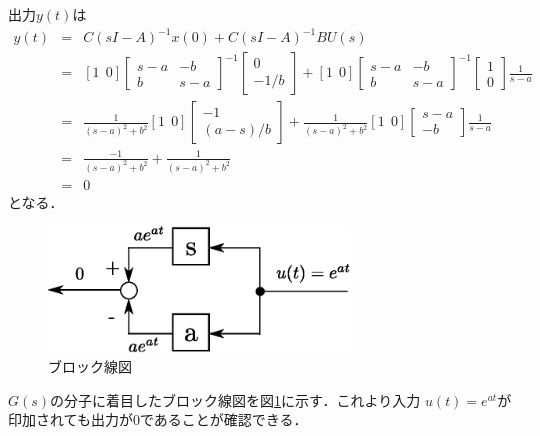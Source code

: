 \documentclass[a4paper,12pt]{jarticle}
\begin{document}
\vspace{-10mm}
\section*{}
出力$y(t)$は
\begin{eqnarray}
 y(t)&=&C(sI-A)^{-1}x(0)+C(sI-A)^{-1}BU(s) \nonumber\\
 &=&\left[1~~0\right]
  \left[
\begin{array}{cc}
 s-a &-b\\
 b &s-a
\end{array}
\right]^{-1}\left[
\begin{array}{c}
 0\\
 -1/b
\end{array}
\right]+\left[1~~0\right]
\left[
\begin{array}{cc}
 s-a &-b\\
 b &s-a
\end{array}
\right]^{-1}\left[
\begin{array}{c}
 1\\
 0
\end{array}
\right]\frac{1}{s-a}
\nonumber\\
 &=&
  \frac{1}{(s-a)^2+b^2}
  \left[1~~0\right]\left[
\begin{array}{c}
-1\\
 (a-s)/b 
\end{array}
\right]+ \frac{1}{(s-a)^2+b^2}\left[1~~0\right]
\left[
\begin{array}{cc}
 s-a\\
 -b 
\end{array}
\right]\frac{1}{s-a}\nonumber\\
 &=& \frac{-1}{(s-a)^2+b^2}+ \frac{1}{(s-a)^2+b^2}\nonumber\\
 &=&0
\end{eqnarray}
となる．
%
\begin{figure}[tbp]
 \begin{center}
  \includegraphics[width=80mm]{fig/burokku.eps}
 \end{center}
 \caption{ブロック線図}
 \label{fig:bro}
\end{figure}
%
$G(s)$の分子に着目したブロック線図を図\ref{fig:bro}に示す．これより入力
$u(t)=e^{at}$が印加されても出力が$0$であることが確認できる．
\end{document}
